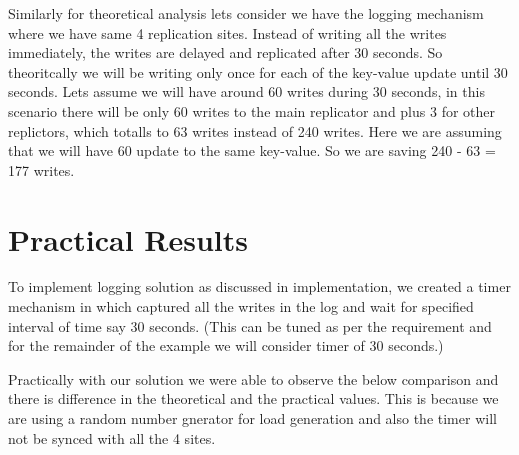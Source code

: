 Similarly for theoretical analysis lets consider we have the logging mechanism where we have same 4 replication sites. Instead of writing all the writes immediately, the writes are delayed and replicated after 30 seconds. So theoritcally we will be writing only once for each of the key-value update until 30 seconds. Lets assume we will have around 60 writes during 30 seconds, in this scenario there will be only 60 writes to the main replicator and plus 3 for other replictors, which totalls to 63 writes instead of 240 writes. Here we are assuming that we will have 60 update to the same key-value. So we are saving {240 - 63 = 177} writes.




\section{Practical Results}

To implement logging solution as discussed in implementation, we created a timer mechanism in which captured all the writes in the log and wait for specified interval of time say 30 seconds. (This can be tuned as per the requirement and for the remainder of the example we will consider timer of 30 seconds.)

Practically with our solution we were able to observe the below comparison and there is difference in the theoretical and the practical values. This is because we are using a random number gnerator for load generation and also the timer will not be synced with all the 4 sites.

